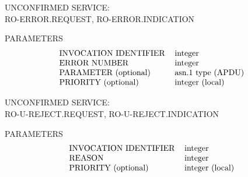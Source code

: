 \begin{bwslide}

\begin{nrtc}
\item	UNCONFIRMED SERVICE:\\ RO-ERROR.REQUEST, RO-ERROR.INDICATION

\item	PARAMETERS
\[\begin{tabular}{ll}
    INVOCATION IDENTIFIER&	integer\\
    ERROR NUMBER&		integer\\
    PARAMETER (optional)&	asn.1 type (APDU)\\
    PRIORITY (optional)&	integer (local)
\end{tabular}\]
\end{nrtc}
\end{bwslide}


\begin{bwslide}

\begin{nrtc}
\item	UNCONFIRMED SERVICE:\\ RO-U-REJECT.REQUEST, RO-U-REJECT.INDICATION

\item	PARAMETERS
\[\begin{tabular}{ll}
    INVOCATION IDENTIFIER&	integer\\
    REASON&			integer\\

    PRIORITY (optional)&	integer (local)
\end{tabular}\]
\end{nrtc}
\end{bwslide}


